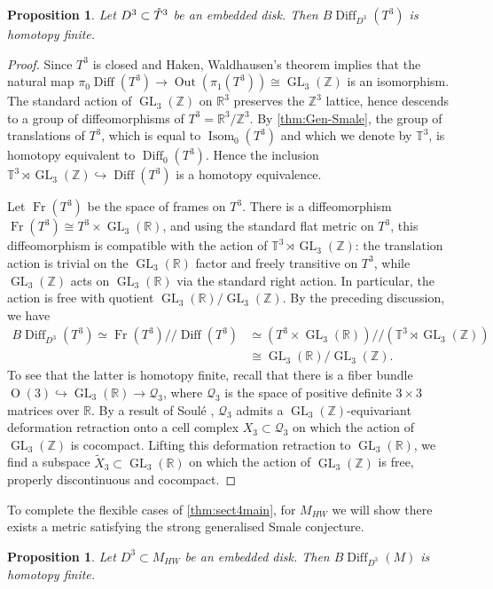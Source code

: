 \documentclass{amsart}
\theoremstyle{plain}
\newtheorem{prop}[thm]{Proposition}
\theoremstyle{definition}
\DeclareMathOperator\Diff{Diff}
\DeclareMathOperator\Isom{Isom}
\DeclareMathOperator\Or{O}
\DeclareMathOperator\GL{GL}
\DeclareMathOperator\Fr{Fr}
\newcommand{\interior}[1]{\smash{\mathring{#1}}}
\DeclareMathOperator{\Out}{Out}
\newcommand{\hq}{/\!\!/} %
\newcommand{\BDiff}{B\!\Diff}
\newcommand{\bbZ}{\mathbb{Z}}
\newcommand{\bbR}{\mathbb{R}}
\newcommand{\bbT}{\mathbb{T}}
\newcommand{\Z}{\mathbb{Z}}
\begin{document}
\begin{prop}\label{prop:T3-Finiteness}
    Let $D^3\subset \interior{T}^3$ be an embedded disk.  Then $\BDiff_{D^3}(T^3)$ is homotopy finite.
\end{prop}
\begin{proof}
    Since $T^3$ is closed and Haken, Waldhausen's theorem \cite{Waldhausen68} implies that the natural map $\pi_0\Diff(T^3)\rightarrow \Out(\pi_1(T^3))\cong \GL_3(\Z)$ is an isomorphism. The standard action of $\GL_3(\bbZ)$ on $\bbR^3$ preserves the $\bbZ^3$ lattice, hence descends to a group of diffeomorphisms of $T^3=\bbR^3/\bbZ^3$.
    By  \cref{thm:Gen-Smale}, the group of translations of $T^3$, which is equal to $\Isom_0(T^3)$ and which we denote by $\bbT^3$, is homotopy equivalent to $\Diff_0(T^3)$. Hence the inclusion $\bbT^3\rtimes\GL_3(\bbZ)\hookrightarrow \Diff(T^3)$ is a homotopy equivalence.
    
    Let $\Fr(T^3)$ be the space of frames on $T^3$. There is a diffeomorphism $\Fr(T^3)\cong T^3\times \GL_3(\bbR)$, and using the standard flat metric on $T^3$, this diffeomorphism is compatible with the action of $\bbT^3\rtimes \GL_3(\Z)$: the translation action is trivial on the $\GL_3(\bbR)$ factor and freely transitive on $T^3$, while $\GL_3(\Z)$ acts on $\GL_3(\bbR)$ via the standard right action. In particular, the action is free with quotient $\GL_3(\bbR)/\GL_3(\Z)$. 
    By the preceding discussion, we have 
    \begin{align*}\BDiff_{D^3}(T^3)\simeq \Fr(T^3)\hq \Diff(T^3)&\simeq (T^3\times \GL_3(\bbR))\hq (\bbT^3\rtimes \GL_3(\Z))\\ &\cong\GL_3(\bbR)/\GL_3(\Z).\end{align*}
    To see that the latter is homotopy finite, recall that there is a fiber bundle $\Or(3)\hookrightarrow\GL_3(\bbR)\rightarrow \mathcal{Q}_3$, where $\mathcal{Q}_3$ is the space of positive definite $3\times3$ matrices over $\bbR$. By a result of Soul\'e \cite{Soule78}, $\mathcal{Q}_3$ admits a $\GL_3(\Z)$-equivariant deformation retraction onto a cell complex $X_3\subset \mathcal{Q}_3$ on which the action of $\GL_3(\Z)$ is cocompact.  Lifting this deformation retraction to $\GL_3(\bbR)$, we find a subspace $\widetilde{X}_3\subset \GL_3(\bbR)$ on which the action of $\GL_3(\Z)$ is free, properly discontinuous and cocompact.    
\end{proof}



To complete the flexible cases of \cref{thm:sect4main}, for $M_{HW}$ we will show there exists a metric satisfying the strong generalised Smale conjecture.
\begin{prop}\label{prop:Hantzsche-Wendt} Let $D^3\subset M_{HW}$ be an embedded disk.  Then $\BDiff_{D^3}(M)$ is homotopy finite.
\end{prop}
\end{document}
